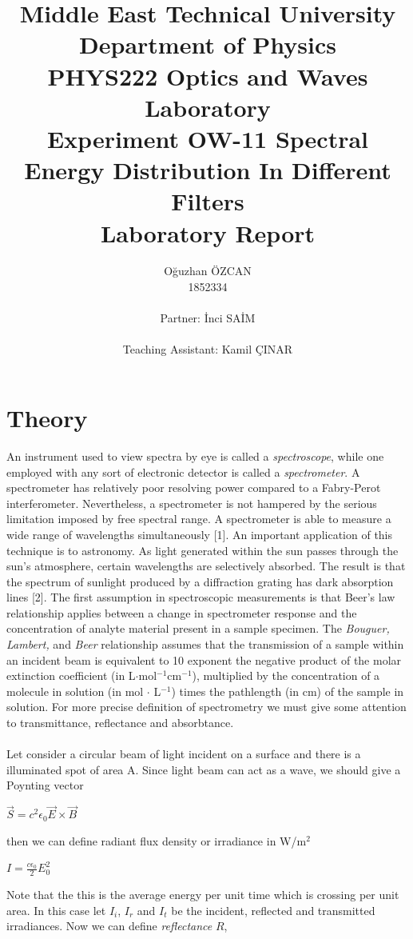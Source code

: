\documentclass[a4paper,12pt]{report}
\title{Middle East Technical University\\Department of Physics\\PHYS222 Optics and Waves Laboratory\\\textbf{Experiment OW-11 Spectral Energy Distribution In Different Filters\\Laboratory Report}}
\author{Oğuzhan ÖZCAN\\1852334\\\\Partner: İnci SAİM\\\\Teaching Assistant: Kamil ÇINAR}
\begin{document}
\maketitle
\tableofcontents
\listoffigures
\listoftables
\chapter{Theory}
An instrument used to view spectra by eye is called a \textit{spectroscope}, while
one employed with any sort of electronic detector is called a \textit{spectrometer}. A spectrometer has relatively poor resolving power compared to a Fabry-Perot
interferometer. Nevertheless, a spectrometer is not hampered by the serious
limitation imposed by free spectral range. A spectrometer is able to measure a
wide range of wavelengths simultaneously [1]. An important application of this technique is to astronomy. As light generated
within the sun passes through the sun’s atmosphere, certain wavelengths are
selectively absorbed. The result is that the spectrum of sunlight produced by a
diffraction grating has dark absorption lines [2]. The first assumption in spectroscopic measurements is that Beer's law
relationship applies between a change in spectrometer response and the
concentration of analyte material present in a sample specimen. The
\textit{Bouguer, Lambert,} and \textit{Beer} relationship assumes that the transmission of a
sample within an incident beam is equivalent to 10 exponent the negative
product of the molar extinction coefficient (in L$\cdot$mol$^{-1}$cm$^{-1}$), multiplied
by the concentration of a molecule in solution (in mol $\cdot$ L$^{-1}$) times the pathlength
(in cm) of the sample in solution. For more precise definition of spectrometry we must give some attention to transmittance, reflectance and absorbtance.\\\\
Let consider a circular beam of light incident on a surface and there is a illuminated spot of area A. Since light beam can act as a wave, we should give a Poynting vector
\begin{center}
	$\vec{S}=c^{2}\epsilon_{0}\vec{E}\times\vec{B}$
\end{center}
then we can define radiant flux density or irradiance in W/m$^{2}$
\begin{center}
	$I=\frac{c\epsilon_{0}}{2}E_{0}^{2}$
\end{center}
Note that the this is the average energy per unit time which is crossing per unit area. In this case let $I_{i}$, $I_{r}$ and $I_{t}$ be the incident, reflected and transmitted irradiances. Now we can define \textit{reflectance} $R$,
\end{document}
